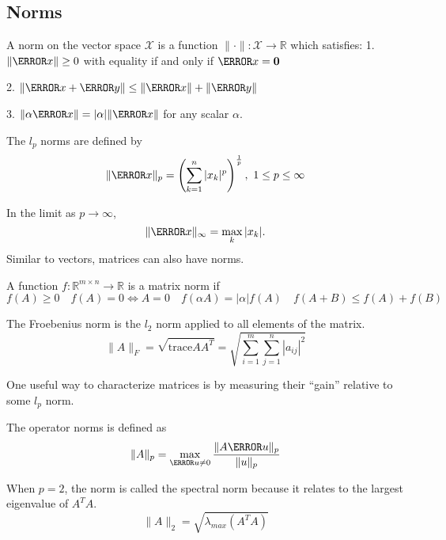 \subsection{Norms}
\begin{definition}
  A norm on the vector space $\mathcal{X}$ is a function $\|\cdot\|:\mathcal{X}\rightarrow\mathbb{R}$ which satisfies:
	1. $\|\V{x}\|\geq 0$ with equality if and only if $\V{x}=\bs{0}$

	2. $\|\V{x}+\V{y}\|\leq\|\V{x}\|+\|\V{y}\|$

	3. $\|\alpha \V{x}\| = |\alpha|\|\V{x}\|$ for any scalar $\alpha$.
  \label{defn:norm}
\end{definition}
\begin{definition}
  The $l_p$ norms are defined by
  \[
		\|\V{x}\|_p=\left( \sum_{k=1}^n|x_k|^p \right)^{\frac{1}{p}},\ 1\leq p\leq \infty
  \]
  \label{defn:lp-norm}
\end{definition}
In the limit as $p\to\infty$, \[
	\norm{\V{x}}_{\infty} = \max_k|x_k|.
\]
Similar to vectors, matrices can also have norms.
\begin{definition}
  A function $f: \mathbb{R}^{m\times n} \to \mathbb{R}$ is a matrix norm if 
  \[
		f(A) \geq 0 \quad f(A) = 0 \Leftrightarrow A = 0 \quad f(\alpha A) = |\alpha| f(A) \quad f(A+B) \leq f(A) + f(B)
  \]
  \label{defn:matrix-norm}
\end{definition}
\begin{definition}
  The Froebenius norm is the $l_2$ norm applied to all elements of the matrix.
  \[
	\|A\|_F = \sqrt{\text{trace} AA^T} = \sqrt{\sum_{i=1}^m \sum_{j=1}^n |a_{ij}|^2}
  \]
  \label{defn:froebenius-norm}
\end{definition}
One useful way to characterize matrices is by measuring their ``gain'' relative to some $l_p$ norm.
\begin{definition}
  The operator norms is defined as
  \[
	\|A\|_p = \max_{\V{u}\ne0} \frac{\|A\V{u}\|_p}{\|u\|_p}
  \]
  \label{defn:operator-norm}
\end{definition}
When $p=2$, the norm is called the spectral norm because it relates to the largest eigenvalue of $A^TA$.
\[
	\|A\|_2 = \sqrt{\lambda_{max}(A^TA)}
\]
